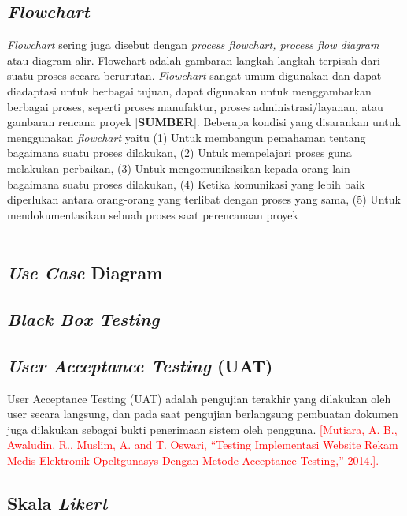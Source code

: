 \begin{flushleft}
\begin{justify}
        \subsection{\textit{Flowchart}}
        \textit{Flowchart} sering juga disebut dengan \textit{process flowchart, process flow diagram} atau diagram alir. Flowchart adalah gambaran langkah-langkah terpisah dari suatu proses secara berurutan. 
        \textit{Flowchart} sangat umum digunakan dan dapat diadaptasi untuk berbagai tujuan, dapat digunakan untuk menggambarkan berbagai proses, seperti proses manufaktur, proses administrasi/layanan, atau gambaran rencana proyek [\textbf{SUMBER}].
        Beberapa kondisi yang disarankan untuk menggunakan \textit{flowchart} yaitu 
        (1) Untuk membangun pemahaman tentang bagaimana suatu proses dilakukan,
        (2) Untuk mempelajari proses guna melakukan perbaikan,
        (3) Untuk mengomunikasikan kepada orang lain bagaimana suatu proses dilakukan,
        (4) Ketika komunikasi yang lebih baik diperlukan antara orang-orang yang terlibat dengan proses yang sama,
        (5) Untuk mendokumentasikan sebuah proses saat perencanaan proyek
        \\\\

        \subsection{\textit{Use Case} Diagram}

        \subsection{\textit{Black Box Testing}}

        \subsection{\textit{User Acceptance Testing} (UAT)}
        \noindent User Acceptance Testing (UAT) adalah pengujian terakhir yang dilakukan oleh user secara langsung, dan pada saat pengujian berlangsung pembuatan dokumen juga dilakukan sebagai bukti penerimaan sistem oleh pengguna. 
        \textcolor{red}{[Mutiara, A. B., Awaludin, R., Muslim, A. and T. Oswari, “Testing Implementasi Website Rekam Medis Elektronik Opeltgunasys Dengan Metode Acceptance Testing,” 2014.].
        }
        

        \subsection{Skala \textit{Likert}}

    \end{justify}



\end{flushleft}



\newpage